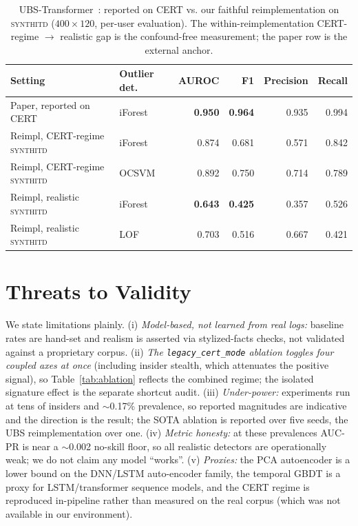 \documentclass[11pt]{article}
\newcommand{\sys}{\textsc{synthitd}}
\newcommand{\code}[1]{\texttt{\small #1}}
\begin{document}
\begin{table}[t]
\centering
\caption{UBS-Transformer~\citep{ubstransformer2025}: reported on CERT vs. our faithful
reimplementation on \sys{} ($400\times120$, per-user evaluation). The
within-reimplementation CERT-regime $\rightarrow$ realistic gap is the confound-free
measurement; the paper row is the external anchor.}
\label{tab:ubs}
\small
\begin{tabular}{llrrrr}
\toprule
Setting & Outlier det. & AUROC & F1 & Precision & Recall \\
\midrule
Paper, reported on CERT        & iForest & \textbf{0.950} & \textbf{0.964} & 0.935 & 0.994 \\
Reimpl, CERT-regime \sys{}     & iForest & 0.874 & 0.681 & 0.571 & 0.842 \\
Reimpl, CERT-regime \sys{}     & OCSVM   & 0.892 & 0.750 & 0.714 & 0.789 \\
Reimpl, realistic \sys{}       & iForest & \textbf{0.643} & \textbf{0.425} & 0.357 & 0.526 \\
Reimpl, realistic \sys{}       & LOF     & 0.703 & 0.516 & 0.667 & 0.421 \\
\bottomrule
\end{tabular}
\end{table}

\section{Threats to Validity}
\label{sec:threats}
We state limitations plainly. (i) \emph{Model-based, not learned from real logs:}
baseline rates are hand-set and realism is asserted via stylized-facts checks, not
validated against a proprietary corpus. (ii) \emph{The \code{legacy\_cert\_mode}
ablation toggles four coupled axes at once} (including insider stealth, which
attenuates the positive signal), so Table~\ref{tab:ablation} reflects the combined
regime; the isolated signature effect is the separate shortcut audit. (iii)
\emph{Under-power:} experiments run at tens of insiders and $\sim$0.17\% prevalence, so
reported magnitudes are indicative and the direction is the result; the SOTA ablation
is reported over five seeds, the UBS reimplementation over one. (iv) \emph{Metric
honesty:} at these prevalences AUC-PR is near a $\sim$0.002 no-skill floor, so all
realistic detectors are operationally weak; we do not claim any model ``works''. (v)
\emph{Proxies:} the PCA autoencoder is a lower bound on the DNN/LSTM auto-encoder
family, the temporal GBDT is a proxy for LSTM/transformer sequence models, and the
CERT regime is reproduced in-pipeline rather than measured on the real corpus (which
was not available in our environment).
\end{document}
